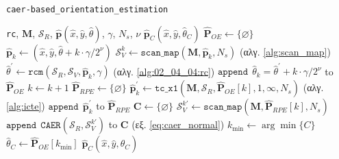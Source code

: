 \begin{algorithm}[!h]
  \caption{\texttt{caer-based\_orientation\_estimation}}
  \begin{spacing}{1.5}
  \begin{algorithmic}[1]
    \REQUIRE \texttt{rc}, $\bm{M}$, $\mathcal{S}_R$, $\hat{\bm{p}}(\hat{x}, \hat{y}, \hat{\theta})$, $\gamma$, $N_s$, $\nu$
    \ENSURE $\hat{\bm{p}}_C(\hat{x}, \hat{y}, \hat{\theta}_C)$
    \STATE $\hat{\bm{P}}_{OE} \leftarrow \{\varnothing\}$
      \STATE $\hat{\bm{p}}_k \leftarrow (\hat{x}, \hat{y}, \hat{\theta} + k \cdot \gamma/2^\nu)$
      \STATE $\mathcal{S}_V^k \leftarrow \texttt{scan\_map}(\bm{M}, \hat{\bm{p}}_k, N_s)$ \hfill (αλγ. \ref{alg:scan_map})
      \STATE $\hat{\theta}^\prime \leftarrow \texttt{rcm}(\mathcal{S}_R, \mathcal{S}_V, \hat{\bm{p}}_k, \gamma)$ \hfill (αλγ. \ref{alg:02_04_04:rc})
      \STATE $\texttt{append} \ \ \hat{\theta}_k = \hat{\theta}^\prime + k \cdot \gamma/2^\nu$ to $\hat{\bm{P}}_{OE}$
      \STATE $k \leftarrow k + 1$
    \ENDFOR
    \STATE $\hat{\bm{P}}_{RPE} \leftarrow \{\varnothing\}$
      \STATE $\hat{\bm{p}}_k^\prime \leftarrow \texttt{tc\_x1}(\bm{M}, \mathcal{S}_R, \hat{\bm{P}}_{OE}[k], 1, \infty, N_s)$ \hfill (αλγ. \ref{alg:icte})
      \STATE $\texttt{append} \ \ \hat{\bm{p}}_k^\prime$ to $\hat{\bm{P}}_{RPE}$
    \ENDFOR
    \STATE $\bm{C} \leftarrow \{\varnothing\}$
      \STATE $\mathcal{S}_V^{k \prime} \leftarrow \texttt{scan\_map}(\bm{M}, \hat{\bm{P}}_{RPE}[k], N_s)$
      \STATE $\texttt{append} \ \ \texttt{CAER}(\mathcal{S}_R, \mathcal{S}_V^{k \prime})$ to $\bm{C}$ \hfill (εξ. \ref{eq:caer_normal})
    \ENDFOR
    \STATE $k_{\min} \leftarrow \arg\min \{C\}$
    \STATE $\hat{\theta}_C \leftarrow \hat{\bm{P}}_{OE}[k_{\min}]$
    \RETURN $\hat{\bm{p}}_C(\hat{x}, \hat{y}, \hat{\theta}_C)$
  \end{algorithmic}
  \end{spacing}
  \label{}
\end{algorithm}

